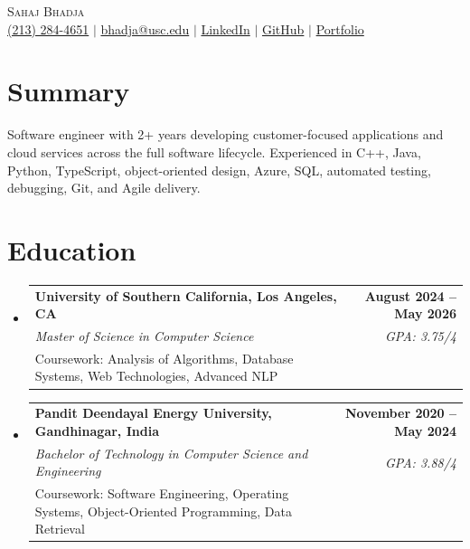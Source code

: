 \documentclass[letterpaper,10pt]{article}
\makeatletter
\newcommand{\resumeEduSubheading}[5]{\vspace{-1pt}\item\begin{tabular*}{1.0\textwidth}[t]{l@{\extracolsep{\fill}}r}\textbf{#1} & \textbf{\small #2} \\\textit{\small #3} & \textit{\small #4} \\\small #5 & \\\end{tabular*}\vspace{-4pt}}
\newcommand{\resumeSubHeadingListStart}{\begin{itemize}[leftmargin=0.0in,label={}]}
\newcommand{\resumeSubHeadingListEnd}{\end{itemize}}
\makeatother
\begin{document}
\begin{center}
  {\Huge \scshape Sahaj Bhadja} \\ \vspace{1pt}
  \small \href{tel:2132844651}{(213) 284-4651} $|$ \href{mailto:bhadja@usc.edu}{bhadja@usc.edu} $|$
  \href{https://www.linkedin.com/in/sahaj-bhadja/}{LinkedIn} $|$ \href{https://github.com/sahaj-bhadja}{GitHub} $|$ \href{https://sahaj-bhadja.github.io/}{Portfolio}
\end{center}
\vspace{-13pt}

\section{Summary}
\small Software engineer with 2+ years developing customer-focused applications and cloud services across the full software lifecycle. Experienced in C++, Java, Python, TypeScript, object-oriented design, Azure, SQL, automated testing, debugging, Git, and Agile delivery.

\section{Education}
\resumeSubHeadingListStart
  \resumeEduSubheading{University of Southern California, Los Angeles, CA}{August 2024 -- May 2026}{Master of Science in Computer Science}{GPA: 3.75/4}{Coursework: Analysis of Algorithms, Database Systems, Web Technologies, Advanced NLP}
  \vspace{2pt}
  \resumeEduSubheading{Pandit Deendayal Energy University, Gandhinagar, India}{November 2020 -- May 2024}{Bachelor of Technology in Computer Science and Engineering}{GPA: 3.88/4}{Coursework: Software Engineering, Operating Systems, Object-Oriented Programming, Data Retrieval}
\resumeSubHeadingListEnd
\end{document}
